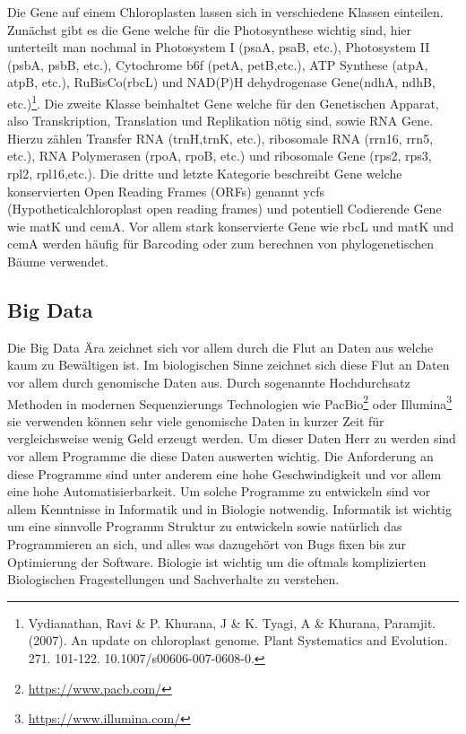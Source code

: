 \documentclass{scrartcl}
\begin{document}
Die Gene auf einem Chloroplasten lassen sich in verschiedene Klassen einteilen. Zunächst gibt es die Gene welche für die Photosynthese wichtig sind,
hier unterteilt man nochmal in Photosystem I (psaA, psaB, etc.), Photosystem II (psbA, psbB, etc.), Cytochrome b6f (petA, petB,etc.), 
ATP Synthese (atpA, atpB, etc.), RuBisCo(rbcL) und NAD(P)H dehydrogenase Gene(ndhA, ndhB, etc.)\footnote{Vydianathan, Ravi \& P. Khurana, J \& K. Tyagi, A \& Khurana, Paramjit. (2007). An update on chloroplast genome. Plant Systematics and Evolution. 271. 101-122. 10.1007/s00606-007-0608-0.}. Die zweite Klasse beinhaltet Gene welche für den
Genetischen Apparat, also Transkription, Translation und Replikation nötig sind, sowie RNA Gene. Hierzu zählen Transfer RNA (trnH,trnK, etc.), ribosomale RNA (rrn16, rrn5, etc.), 
RNA Polymerasen (rpoA, rpoB, etc.) und ribosomale Gene (rps2, rps3, rpl2, rpl16,etc.). Die dritte und letzte Kategorie beschreibt Gene welche konservierten Open Reading Frames (ORFs)
genannt ycfs (Hypotheticalchloroplast open reading frames) und potentiell Codierende Gene wie matK und cemA\footnotemark[6]{}. Vor allem stark konservierte Gene wie rbcL und matK und cemA werden 
häufig für Barcoding oder zum berechnen von phylogenetischen Bäume verwendet.
\subsection{Big Data}
\label{sec-1-2}
Die Big Data Ära zeichnet sich vor allem durch die Flut an Daten aus welche kaum zu Bewältigen ist. Im biologischen Sinne zeichnet sich diese 
Flut an Daten vor allem durch genomische Daten aus. Durch sogenannte Hochdurchsatz Methoden in modernen Sequenzierungs Technologien wie PacBio\footnote{\url{https://www.pacb.com/}} oder Illumina\footnote{\url{https://www.illumina.com/}}
sie verwenden können sehr viele genomische Daten in kurzer Zeit für vergleichsweise wenig Geld erzeugt werden. Um dieser Daten Herr zu werden sind vor allem
Programme die diese Daten auswerten wichtig. Die Anforderung an diese Programme sind unter anderem eine hohe Geschwindigkeit und vor allem eine hohe 
Automatisierbarkeit. Um solche Programme zu entwickeln sind vor allem Kenntnisse in Informatik und in Biologie notwendig. Informatik ist wichtig um eine sinnvolle Programm Struktur 
zu entwickeln sowie natürlich das Programmieren an sich, und alles was dazugehört von Bugs fixen bis zur Optimierung der Software. Biologie ist wichtig um die oftmals komplizierten
Biologischen Fragestellungen und Sachverhalte zu verstehen.  
\end{document}
